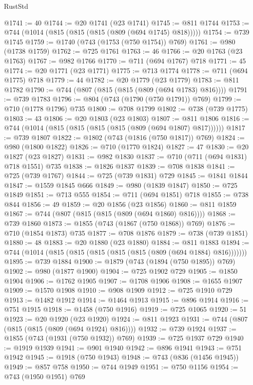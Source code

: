 \begin{lexlean}{RustStd}
\begin{coremodule}
@1741 := 40
@1744 := @20 @1741 (@23 @1741)
@1745 := @811 @1744
@1753 := @744 (@1014 (@815 (@815 (@815 (@809 (@694 @1745) @818)))))
@1754 := @739 @1745
@1759 := @1740 (@743 (@1753 (@750 @1754)) @769)
@1761 := @980 (@1738 @1759)
@1762 := @725 @1761
@1763 := 46
@1766 := @20 @1763 (@23 @1763)
@1767 := @982 @1766
@1770 := @711 (@694 @1767) @718
@1771 := 45
@1774 := @20 @1771 (@23 @1771)
@1775 := @713 @1774
@1778 := @711 (@694 @1775) @718
@1779 := 44
@1782 := @20 @1779 (@23 @1779)
@1783 := @811 @1782
@1790 := @744 (@807 (@815 (@815 (@809 (@694 @1783) @816))))
@1791 := @739 @1783
@1796 := @804 (@743 (@1790 (@750 @1791)) @769)
@1799 := @710 (@1778 @1796) @735
@1800 := @708 @1799
@1802 := @738 (@739 @1775)
@1803 := 43
@1806 := @20 @1803 (@23 @1803)
@1807 := @811 @1806
@1816 := @744 (@1014 (@815 (@815 (@815 (@815 (@809 (@694 @1807) @817))))))
@1817 := @739 @1807
@1822 := @1802 (@743 (@1816 (@750 @1817)) @769)
@1824 := @980 (@1800 @1822)
@1826 := @710 (@1770 @1824)
@1827 := 47
@1830 := @20 @1827 (@23 @1827)
@1831 := @982 @1830
@1837 := @710 (@711 (@694 @1831) @718 @1551) @735
@1838 := @1826 @1837
@1839 := @708 @1838
@1841 := @725 (@739 @1767)
@1844 := @725 (@739 @1831) @729
@1845 := @1841 @1844
@1847 := @1559 @1845 @666
@1849 := @980 (@1839 @1847)
@1850 := @725 @1849
@1851 := @713 @555
@1854 := @711 (@694 @1851) @718
@1855 := @738 @844
@1856 := 49
@1859 := @20 @1856 (@23 @1856)
@1860 := @811 @1859
@1867 := @744 (@807 (@815 (@815 (@809 (@694 @1860) @816))))
@1868 := @739 @1860
@1873 := @1855 (@743 (@1867 (@750 @1868)) @769)
@1876 := @710 (@1854 @1873) @735
@1877 := @708 @1876
@1879 := @738 (@739 @1851)
@1880 := 48
@1883 := @20 @1880 (@23 @1880)
@1884 := @811 @1883
@1894 := @744 (@1014 (@815 (@815 (@815 (@815 (@815 (@809 (@694 @1884) @816)))))))
@1895 := @739 @1884
@1900 := @1879 (@743 (@1894 (@750 @1895)) @769)
@1902 := @980 (@1877 @1900)
@1904 := @725 @1902 @729
@1905 := @1850 @1904
@1906 := @1762 @1905
@1907 := @1708 @1906
@1908 := @1655 @1907
@1909 := @1570 @1908
@1910 := @908 @1909
@1912 := @725 @1910 @729
@1913 := @1482 @1912
@1914 := @1464 @1913
@1915 := @896 @1914
@1916 := @751 @1915
@1918 := @1458 (@750 @1916)
@1919 := @725 @1065
@1920 := 51
@1923 := @20 @1920 (@23 @1920)
@1924 := @811 @1923
@1931 := @744 (@807 (@815 (@815 (@809 (@694 @1924) @816))))
@1932 := @739 @1924
@1937 := @1855 (@743 (@1931 (@750 @1932)) @769)
@1939 := @725 @1937 @729
@1940 := @1919 @1939
@1941 := @901 @1940
@1942 := @896 @1941
@1943 := @751 @1942
@1945 := @1918 (@750 @1943)
@1948 := @743 (@836 (@1456 @1945))
@1949 := @857 @758
@1950 := @744 @1949
@1951 := @750 @1156
@1954 := @743 (@1950 @1951) @769

\end{coremodule}
\end{lexlean}
